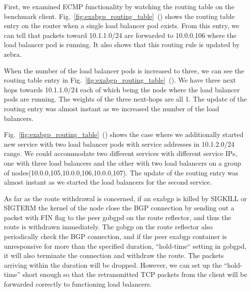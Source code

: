 First, we examined ECMP functionality by watching the routing table on the benchmark client.
Fig.~\ref{fig:exabgp_routing_table}~() shows the routing table entry on the router when a single load balancer pod exists.
From this entry, we can tell that packets toward 10.1.1.0/24 are forwarded to 10.0.0.106 where the load balancer pod is running.
It also shows that this routing rule is updated by zebra.

When the number of the load balancer pods is increased to three, we can see the routing table entry in Fig.~\ref{fig:exabgp_routing_table}~().
We have three next hops towards 10.1.1.0/24 each of which being the node where the load balancer pods are running.
The weights of the three next-hops are all 1.
The update of the routing entry was almost instant as we increased the number of the load balancers.

Fig.~\ref{fig:exabgp_routing_table}~() shows the case where we additionally started new service with two load balancer pods with service addresses in 10.1.2.0/24 range.
We could accommodate two different services with different service IPs, one with three load balancers and the other with two load balancers on a group of nodes(10.0.0,105,10.0.0,106,10.0.0,107).
The update of the routing entry was almost instant as we started the load balancers for the second service.

As far as the route withdrawal is concerned, if an exabgp is killed by SIGKILL or SIGTERM the kernel of the node close the BGP connection by sending out a packet with FIN flag to the peer gobgpd on the route reflector, and thus the route is withdrawn immediately.
The gobgp on the route reflector also periodically check the BGP connection, and if the peer exabgp container is unresponsive for more than the specified duration, “hold-time“ setting in gobgpd, it will also terminate the connection and withdraw the route.
The packets arriving within the duration will be dropped.
However, we can set up the “hold-time” short enough so that the retransmitted TCP packets from the client will be forwarded correctly to functioning load balancers.


